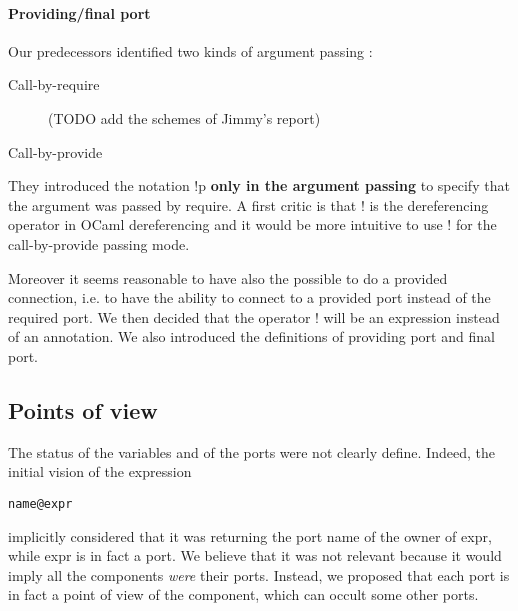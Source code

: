 \paragraph{Providing/final port}
Our predecessors identified two kinds of argument passing : 
\begin{description}
\item[Call-by-require] (TODO add the schemes of Jimmy's report)
\item[Call-by-provide]
\end{description}

They introduced the notation \textsf{!p} \textbf{only in the argument passing} to specify that the argument was passed by require. A first critic is that ! is the dereferencing operator in OCaml dereferencing and it would be more intuitive to use ! for the call-by-provide passing mode.

Moreover it seems reasonable to have also the possible to do a provided connection, i.e. to have the ability to connect to a provided port instead of the required port. We then decided that the operator ! will be an expression instead of an annotation. We also introduced the definitions of providing port and final port.


\subsection{Points of view}
The status of the variables and of the ports were not clearly define. Indeed, the initial vision of the expression
\begin{lstlisting}
name@expr
\end{lstlisting} implicitly considered that it was returning the port \textsf{name} of the owner of \textsf{expr}, while expr is in fact a port. We believe that it was not relevant because it would imply all the components \textit{were} their ports. Instead, we proposed that each port is in fact a point of view of the component, which can occult some other ports.


